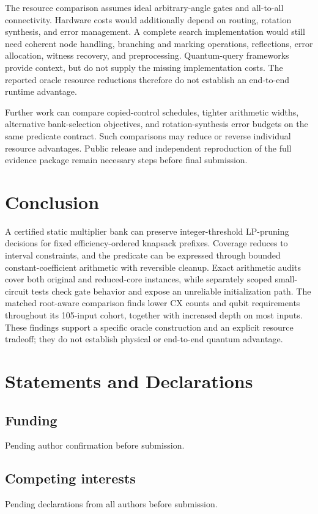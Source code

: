 \documentclass[referee,pdflatex,sn-mathphys-num]{sn-jnl}
\theoremstyle{thmstyleone}
\theoremstyle{thmstyletwo}
\begin{document}
The resource comparison assumes ideal arbitrary-angle gates and all-to-all connectivity. Hardware costs would additionally depend on routing, rotation synthesis, and error management. A complete search implementation would still need coherent node handling, branching and marking operations, reflections, error allocation, witness recovery, and preprocessing. Quantum-query frameworks \cite{ref35,ref24} provide context, but do not supply the missing implementation costs. The reported oracle resource reductions therefore do not establish an end-to-end runtime advantage.

Further work can compare copied-control schedules, tighter arithmetic widths, alternative bank-selection objectives, and rotation-synthesis error budgets on the same predicate contract. Such comparisons may reduce or reverse individual resource advantages. Public release and independent reproduction of the full evidence package remain necessary steps before final submission.

\section{Conclusion}
A certified static multiplier bank can preserve integer-threshold LP-pruning decisions for fixed efficiency-ordered knapsack prefixes. Coverage reduces to interval constraints, and the predicate can be expressed through bounded constant-coefficient arithmetic with reversible cleanup. Exact arithmetic audits cover both original and reduced-core instances, while separately scoped small-circuit tests check gate behavior and expose an unreliable initialization path. The matched root-aware comparison finds lower CX counts and qubit requirements throughout its 105-input cohort, together with increased depth on most inputs. These findings support a specific oracle construction and an explicit resource tradeoff; they do not establish physical or end-to-end quantum advantage.

\backmatter
\section*{Statements and Declarations}
\subsection*{Funding}
Pending author confirmation before submission.
\subsection*{Competing interests}
Pending declarations from all authors before submission.
\end{document}
